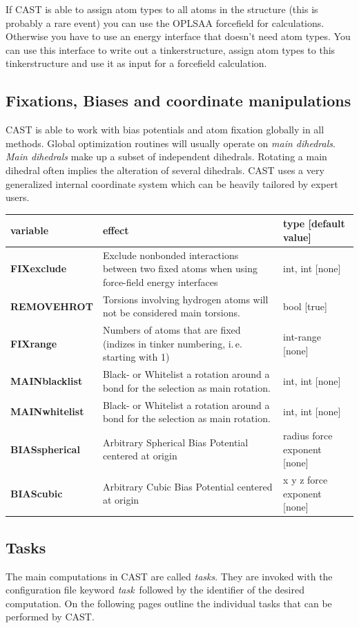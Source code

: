 \documentclass[10pt,a4paper]{article} %
\begin{document}
If CAST is able to assign atom types to all atoms in the structure (this is probably a rare event) you can use the OPLSAA forcefield for calculations. Otherwise you have to use an energy interface that doesn't need atom types. You can use this interface to write out a tinkerstructure, assign atom types to this tinkerstructure and use it as input for a forcefield calculation. 


\subsection{Fixations, Biases and coordinate manipulations}
\ac{CAST} is able to work with bias potentials and atom fixation globally in all methods. Global optimization routines will usually operate on \textit{main dihedrals}. \textit{Main dihedrals} make up a subset of independent dihedrals. Rotating a main dihedral often implies the alteration of several dihedrals. \ac{CAST} uses a very generalized internal coordinate system which can be heavily tailored by expert users.
\begin{longtable}{|p{3cm}|p{5cm}|p{3cm}|}
	variable & effect & type [default value] \\
	\hline
	\textbf{FIXexclude} & Exclude nonbonded interactions between two fixed atoms when using force-field energy interfaces & int, int [none] \\
	\textbf{REMOVEHROT} & Torsions involving hydrogen atoms will not be considered main torsions. & bool [true] \\	
	\textbf{FIXrange} & Numbers of atoms that are fixed (indizes in tinker numbering, i.\,e. starting with 1) & int-range [none] \\
	\textbf{MAINblacklist} & Black- or Whitelist a rotation around a bond for the selection as main rotation. & int, int [none] \\
	\textbf{MAINwhitelist} & Black- or Whitelist a rotation around a bond for the selection as main rotation. & int, int [none] \\
	\textbf{BIASspherical} & Arbitrary Spherical Bias Potential centered at origin & radius force exponent [none] \\
	\textbf{BIAScubic} & Arbitrary Cubic Bias Potential centered at origin & x y z force exponent [none] \\
\end{longtable} 
	
	
	\subsection{Tasks}
	The main computations in \ac{CAST} are called \textit{tasks}. They are invoked with the configuration file keyword \glqq\textit{task}\grqq~followed by the identifier of the desired computation. On the following pages outline the individual tasks that can be performed by \ac{CAST}.
\end{document}
